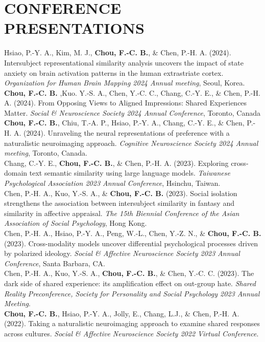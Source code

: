 \documentclass[a4paper,12pt]{article}
\newcommand{\itemspace}{7pt} %
\begin{document}
\section*{CONFERENCE PRESENTATIONS}
\noindent Hsiao, P.-Y. A., Kim, M. J., \textbf{Chou, F.-C. B.}, \& Chen, P.-H. A. (2024). Intersubject representational similarity analysis uncovers the impact of state anxiety on brain activation patterns in the human extrastriate cortex. \textit{Organization for Human Brain Mapping 2024 Annual meeting}, Seoul, Korea.\\[\itemspace]
\noindent\textbf{Chou, F.-C. B.} ,Kuo. Y.-S. A., Chen, Y.-C. C., Chang, C.-Y. E., \& Chen, P.-H. A. (2024). From Opposing Views to Aligned Impressions: Shared Experiences Matter. \textit{Social \& Neuroscience Society 2024 Annual Conference}, Toronto, Canada \\[\itemspace]
\noindent \textbf{Chou, F.-C. B.}, Chiu, T.-A. P., Hsiao, P.-Y. A., Chang, C.-Y. E., \& Chen, P.-H. A. (2024). Unraveling the neural representations of preference with a naturalistic neuroimaging approach. \textit{Cognitive Neuroscience Society 2024 Annual meeting}, Toronto, Canada.\\[\itemspace]
\noindent Chang, C.-Y. E., \textbf{Chou, F.-C. B.}, \& Chen, P.-H. A. (2023). Exploring cross-domain text semantic similarity using large language models. \textit{Taiwanese Psychological Association 2023 Annual Conference}, Hsinchu, Taiwan.\\[\itemspace]
\noindent Chen, P.-H. A., Kuo, Y.-S. A., \& \textbf{Chou, F.-C. B.} (2023). Social isolation strengthens the association between intersubject similarity in fantasy and similarity in affective appraisal. \textit{The 15th Biennial Conference of the Asian Association of Social Psychology}, Hong Kong.\\[\itemspace]
\noindent Chen, P.-H. A., Hsiao, P.-Y. A., Peng, W.-L., Chen, Y.-Z. N., \& \textbf{Chou, F.-C. B.} (2023). Cross-modality models uncover differential psychological processes driven by polarized ideology. \textit{Social \& Affective Neuroscience Society 2023 Annual Conference}, Santa Barbara, CA.\\[\itemspace]
\noindent Chen, P.-H. A., Kuo, Y.-S. A., \textbf{Chou, F.-C. B.}, \& Chen, Y.-C. C. (2023). The dark side of shared experience: its amplification effect on out-group hate. \textit{Shared Reality Preconference, Society for Personality and Social Psychology 2023 Annual Meeting}.\\[\itemspace]
\noindent \textbf{Chou, F.-C. B.}, Hsiao, P.-Y. A., Jolly, E., Chang, L.J., \& Chen, P.-H. A. (2022). Taking a naturalistic neuroimaging approach to examine shared responses across cultures. \textit{Social \& Affective Neuroscience Society 2022 Virtual Conference}.\\[\itemspace]
\end{document}
